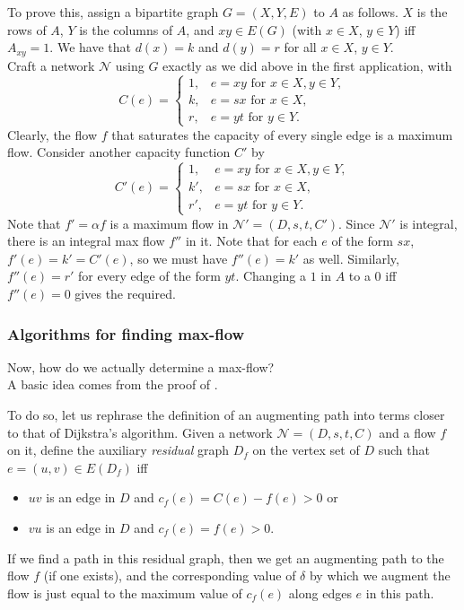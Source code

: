 			To prove this, assign a bipartite graph $G = (X,Y,E)$ to $A$ as follows. $X$ is the rows of $A$, $Y$ is the columns of $A$, and $xy\in E(G)$ (with $x\in X$, $y\in Y$) iff $A_{xy} = 1$. We have that $d(x) = k$ and $d(y) = r$ for all $x\in X$, $y\in Y$.\\
			Craft a network $\mathcal{N}$ using $G$ exactly as we did above in the first application, with
			\[
				C(e) = 
				\begin{cases}
					1, & e = xy\text{ for }x\in X, y\in Y, \\
					k, & e = sx\text{ for }x\in X, \\
					r, & e = yt\text{ for }y\in Y.
				\end{cases}
			\]
			Clearly, the flow $f$ that saturates the capacity of every single edge is a maximum flow. Consider another capacity function $C'$ by
			\[
				C'(e) = 
				\begin{cases}
					1, & e = xy\text{ for }x\in X, y\in Y, \\
					k', & e = sx\text{ for }x\in X, \\
					r', & e = yt\text{ for }y\in Y.
				\end{cases}	
			\]
			Note that $f' = \alpha f$ is a maximum flow in $\mathcal{N}' = (D,s,t,C')$. Since $\mathcal{N}'$ is integral, there is an integral max flow $f''$ in it. Note that for each $e$ of the form $sx$, $f'(e) = k' = C'(e)$, so we must have $f''(e) = k'$ as well. Similarly, $f''(e) = r'$ for every edge of the form $yt$. Changing a $1$ in $A$ to a $0$ iff $f''(e) = 0$ gives the required.

		\subsubsection{Algorithms for finding max-flow}

			Now, how do we actually determine a max-flow?\\
			A basic idea comes from the proof of .

			To do so, let us rephrase the definition of an augmenting path into terms closer to that of Dijkstra's algorithm.
			Given a network $\mathcal{N}=(D,s,t,C)$ and a flow $f$ on it, define the auxiliary \emph{residual} graph $D_f$ on the vertex set of $D$ such that $e = (u,v)\in E(D_f)$ iff
			\begin{itemize}
				\item $uv$ is an edge in $D$ and $c_f(e) = C(e) - f(e) > 0$ or
				\item $vu$ is an edge in $D$ and $c_f(e) = f(e) > 0$.
			\end{itemize}
			If we find a path in this residual graph, then we get an augmenting path to the flow $f$ (if one exists), and the corresponding value of $\delta$ by which we augment the flow is just equal to the maximum value of $c_f(e)$ along edges $e$ in this path.

